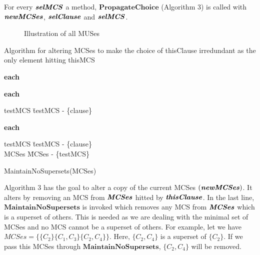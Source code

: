 For every $\textbf{\textit{selMCS}}$ a method, $\textbf{PropagateChoice}$ (Algorithm $3$) is called with $\textbf{\textit{newMCSes}}$, $\textbf{\textit{selClause}}$ and $\textbf{\textit{selMCS}}$.
\begin{figure}[htb] %
	\begin{center}
		
	\end{center}
	\caption{Illustration of all MUSes}
	\label{fig:graphallmuses}
\end{figure}
\begin{Algorithm}
	\caption{Algorithm for altering MCSes to make the choice of thisClause irredundant as the only element hitting thisMCS}
	\label{alg:propagatechoise}
	\begin{algorithm}{}{}
		\begin{FOR}{\textbf{each} }
			\begin{FOR}{\textbf{each} }
				\begin{IF}{}
					testMCS \= testMCS - \{clause\} \\
				\end{IF}
			\end{FOR}
		\end{FOR}
		\begin{FOR}{\textbf{each} }
			\begin{IF}{}
				testMCS \= testMCS - \{clause\} \\
				MCSes \= MCSes - \{testMCS\} \\
			\end{IF}
		\end{FOR}
		MaintainNoSupersets(MCSes)
	\end{algorithm}
\end{Algorithm}
Algorithm $3$ has the goal to alter a copy of the current MCSes $(\textbf{\textit{newMCSes}})$. It alters by removing an MCS from $\textbf{\textit{MCSes}}$ hitted by $\textbf{\textit{thisClause}}$. In the last line, $\textbf{MaintainNoSupersets}$ is invoked which removes any MCS from $\textbf{\textit{MCSes}}$ which is a superset of others. This is needed as we are dealing with the minimal set of MCSes and no MCS cannot be a superset of others. For example, let we have $MCSes=\{\{C_{2}\}\{C_{1}, C_{3}\}\{C_{2},C_{4}\}\}$. Here, $\{C_{2},C_{4}\}$ is a superset of $\{C_{2}\}$. If we pass this MCSes through $\textbf{MaintainNoSupersets}$, $\{C_{2},C_{4}\}$ will be removed.\newline
